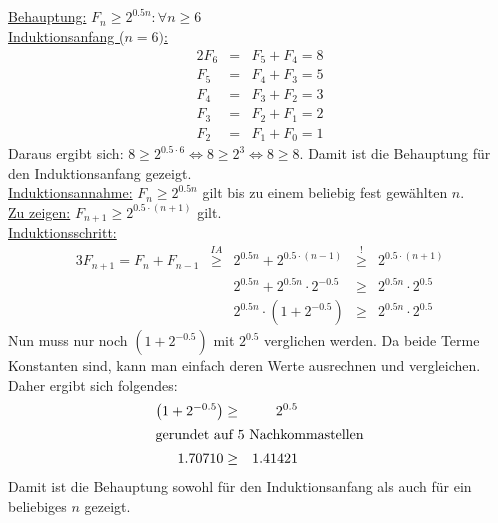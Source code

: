 \documentclass[10pt,a4paper,oneside,ngerman,numbers=noenddot]{scrartcl}
\begin{document}
	\subsection{} %
	\underline{Behauptung:} $F_{n} \geq 2^{0.5n} : \forall n \geq 6$\\
	\underline{Induktionsanfang ($n = 6)$:}\\
		\begin{alignat*}{2}
		F_{6} &=& F_{5} + F_{4} = 8\\
		F_{5} &=& F_{4} + F_{3} = 5\\
		F_{4} &=& F_{3} + F_{2} = 3\\
		F_{3} &=& F_{2} + F_{1} = 2\\
		F_{2} &=& F_{1} + F_{0} = 1
		\end{alignat*}
		Daraus ergibt sich: $8 \geq 2^{0.5 \cdot 6} \Leftrightarrow 8 \geq 2^{3} \Leftrightarrow 8 \geq 8$. Damit ist die Behauptung für den Induktionsanfang gezeigt.\\
	\underline{Induktionsannahme:} $F_{n} \geq 2^{0.5n}$ gilt bis zu einem beliebig fest gewählten $n$.\\
	\underline{Zu zeigen:} $F_{n+1} \geq 2^{0.5 \cdot (n+1)}$ gilt.\\
	\underline{Induktionsschritt:}\\
		\begin{alignat*}{3}
		F_{n+1} = F_{n} + F_{n-1} &\overset{IA}{\geq} & 2^{0.5n} + 2^{0.5 \cdot (n-1)} &\overset{!}{\geq}& 2^{0.5 \cdot (n+1)} \\
		&& 2^{0.5n} + 2^{0.5n} \cdot 2^{-0.5} &\geq& 2^{0.5n} \cdot 2^{0.5} \\
		&& 2^{0.5n} \cdot \left(1 + 2^{-0.5}\right) &\geq & 2^{0.5n} \cdot 2^{0.5}
		\end{alignat*}
		Nun muss nur noch $\left(1 + 2^{-0.5}\right)$ mit $2^{0.5}$ verglichen werden. Da beide Terme Konstanten sind, kann man einfach deren Werte ausrechnen und vergleichen. Daher ergibt sich folgendes:
		\begin{alignat*}{2}
		\left(1 + 2^{-0.5}\right) &\geq & 2^{0.5} \\
		\intertext{gerundet auf $5$ Nachkommastellen}
		1.70710 &\geq & 1.41421
		\end{alignat*}
		Damit ist die Behauptung sowohl für den Induktionsanfang als auch für ein beliebiges $n$ gezeigt.
	\subsection{} %
	
\end{document}
